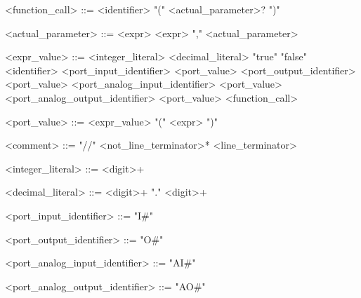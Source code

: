 \begin{grammar}
 <function\_call> ::= <identifier> "(" <actual\_parameter>? ")"
 
 <actual\_parameter> ::= <expr>
 \alt <expr> "," <actual\_parameter>
 
 <expr\_value> ::= <integer\_literal>
 \alt <decimal\_literal>
 \alt "true"
 \alt "false"
 \alt <identifier>
 \alt <port\_input\_identifier> <port\_value>
 \alt <port\_output\_identifier> <port\_value>
 \alt <port\_analog\_input\_identifier> <port\_value>
 \alt <port\_analog\_output\_identifier> <port\_value>
 \alt <function\_call>
 
 <port\_value> ::= <expr\_value>
 \alt "(" <expr> ")"
 
 <comment> ::= "//" <not\_line\_terminator>* <line\_terminator>
 
 <integer\_literal> ::= <digit>+
 
 <decimal\_literal> ::= <digit>+ "." <digit>+
 
 <port\_input\_identifier> ::= "I#"
 
 <port\_output\_identifier> ::= "O#"

 <port\_analog\_input\_identifier> ::= "AI#"
 
 <port\_analog\_output\_identifier> ::= "AO#"
 
  
\end{grammar}